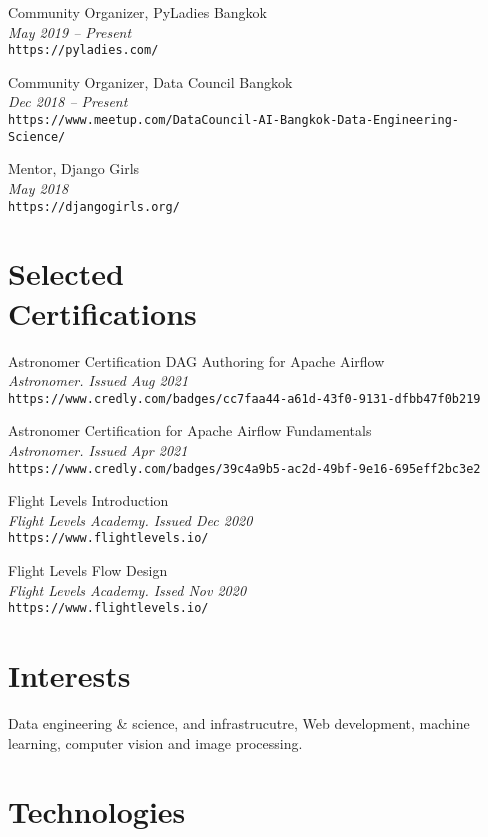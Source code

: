 \documentclass[margin, 10pt]{res}
\begin{document}
\begin{resume}
Community Organizer, PyLadies Bangkok\\
{\it \small May 2019 -- Present}\\
{\tt https://pyladies.com/}

Community Organizer, Data Council Bangkok\\
{\it \small Dec 2018 -- Present}\\
{\tt https://www.meetup.com/DataCouncil-AI-Bangkok-Data-Engineering-Science/}

Mentor, Django Girls\\
{\it \small May 2018}\\
{\tt https://djangogirls.org/}

\section{Selected \\ Certifications}

Astronomer Certification DAG Authoring for Apache Airflow\\
{\it \small Astronomer. Issued Aug 2021}\\
{\tt https://www.credly.com/badges/cc7faa44-a61d-43f0-9131-dfbb47f0b219}

Astronomer Certification for Apache Airflow Fundamentals\\
{\it \small Astronomer. Issued Apr 2021}\\
{\tt https://www.credly.com/badges/39c4a9b5-ac2d-49bf-9e16-695eff2bc3e2}

Flight Levels Introduction\\
{\it \small Flight Levels Academy. Issued Dec 2020}\\
{\tt https://www.flightlevels.io/}

Flight Levels Flow Design\\
{\it \small Flight Levels Academy. Issed Nov 2020}\\
{\tt https://www.flightlevels.io/}

\section{Interests}

Data engineering \& science, and infrastrucutre, Web development,
machine learning, computer vision and image processing.

\section{Technologies}


\end{resume}
\end{document}
